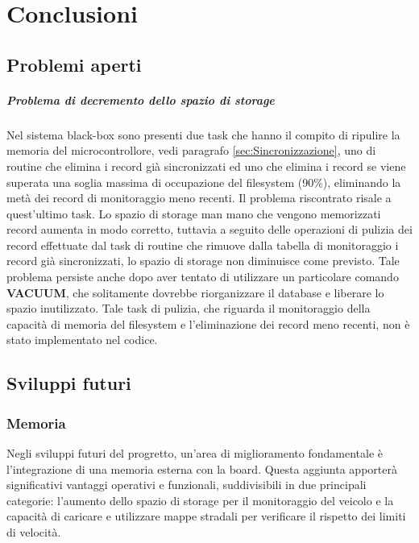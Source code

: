 \documentclass[12pt, a4paper, italian]{report}
\numberwithin{figure}{chapter}
\numberwithin{table}{chapter}
\begin{document}
\chapter{Conclusioni}
\section{Problemi aperti}
\paragraph{Problema di decremento dello spazio di storage}
Nel sistema black-box sono presenti due task che hanno il compito di ripulire la memoria del microcontrollore, vedi paragrafo \ref{sec:Sincronizzazione}, uno di routine che elimina i record già sincronizzati ed uno che elimina i record se viene superata una soglia massima di occupazione del filesystem (90\%), eliminando la metà dei record di monitoraggio meno recenti. Il problema riscontrato risale a quest'ultimo task. Lo spazio di storage man mano che vengono memorizzati record aumenta in modo corretto, tuttavia a seguito delle operazioni di pulizia dei record effettuate dal task di routine che rimuove dalla tabella di monitoraggio i record già sincronizzati, lo spazio di storage non diminuisce come previsto. Tale problema persiste anche dopo aver tentato di utilizzare un particolare comando \textbf{VACUUM}, che solitamente dovrebbe riorganizzare il database e liberare lo spazio inutilizzato. 
Tale task di pulizia, che riguarda il monitoraggio della capacità di memoria del filesystem e l'eliminazione dei record meno recenti, non è stato implementato nel codice.

\section{Sviluppi futuri}
\subsection{Memoria}
Negli sviluppi futuri del progretto, un'area di miglioramento fondamentale è l'integrazione di una memoria esterna con la board. Questa aggiunta apporterà significativi vantaggi operativi e funzionali, suddivisibili in due principali categorie: l'aumento dello spazio di storage per il monitoraggio del veicolo e la capacità di caricare e utilizzare mappe stradali per verificare il rispetto dei limiti di velocità.
\end{document}
